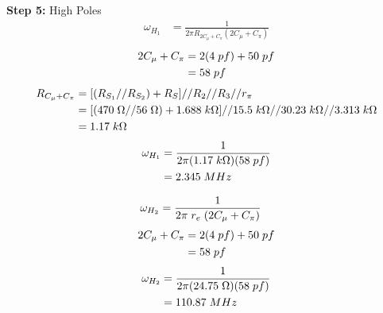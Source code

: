 \documentclass{article}
\begin{document}
	\pagebreak
	\textbf{Step 5:} High Poles\\
	\begin{align*}
		\omega_{H_1} &= \frac{1}{2\pi R_{2C_{\mu} + C_{\pi}} (2C_{\mu} + C_{\pi})}
	\end{align*}
	\begin{align*}
		2C_{\mu} + C_{\pi} &= 2(4 \hspace{1mm} pf) + 50 \hspace{1mm} pf\\
		&= 58 \hspace{1mm} pf
	\end{align*}
	\begin{align*}
		R_{C_{\mu} + C_{\pi}} &= [(R_{S_1} // R_{S_2}) + R_S] // R_2 // R_3 // r_{\pi}\\
		&= [(470 \hspace{1mm} \Omega // 56 \hspace{1mm} \Omega) + 1.688 \hspace{1mm} k\Omega] // 15.5 \hspace{1mm} k\Omega // 30.23 \hspace{1mm} k\Omega // 3.313 \hspace{1mm} k\Omega\\
		&= 1.17 \hspace{1mm} k\Omega
	\end{align*}
	\begin{align*}
		\omega_{H_1} &= \frac{1}{2\pi (1.17 \hspace{1mm} k\Omega)(58 \hspace{1mm} pf)}\\
		&= 2.345 \hspace{1mm} MHz\\
	\end{align*}
	
	\begin{align*}
		\omega_{H_2} &= \frac{1}{2\pi \hspace{1mm} r_e \hspace{1mm} (2C_{\mu} + C_{\pi})}
	\end{align*}
	\begin{align*}
		2C_{\mu} + C_{\pi} &= 2(4 \hspace{1mm} pf) + 50 \hspace{1mm} pf\\
		&= 58 \hspace{1mm} pf
	\end{align*}
	\begin{align*}
		\omega_{H_2} &= \frac{1}{2\pi (24.75 \hspace{1mm} \Omega)(58 \hspace{1mm} pf)}\\
		&= 110.87 \hspace{1mm} MHz\\
	\end{align*}
	
\end{document}
